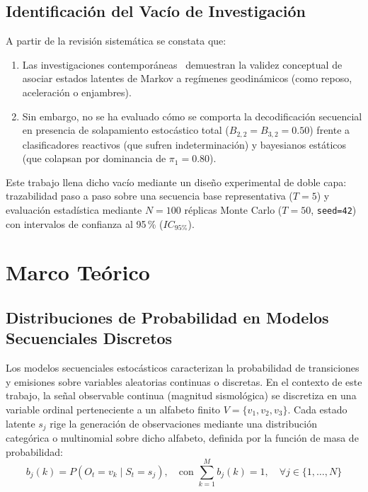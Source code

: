 \documentclass[11pt,a4paper]{article}
\begin{document}
\subsection{Identificación del Vacío de Investigación}

A partir de la revisión sistemática se constata que:
\begin{enumerate}
    \item Las investigaciones contemporáneas~\cite{georgakopoulou2024seismic, allen2023hidden, zhang2023statistical, danisman2021fitting} demuestran la validez conceptual de asociar estados latentes de Markov a regímenes geodinámicos (como reposo, aceleración o enjambres).
    \item Sin embargo, no se ha evaluado cómo se comporta la decodificación secuencial en presencia de solapamiento estocástico total ($B_{2,2} = B_{3,2} = 0.50$) frente a clasificadores reactivos (que sufren indeterminación) y bayesianos estáticos (que colapsan por dominancia de $\pi_1 = 0.80$).
\end{enumerate}

Este trabajo llena dicho vacío mediante un diseño experimental de doble capa: trazabilidad paso a paso sobre una secuencia base representativa ($T=5$) y evaluación estadística mediante $N=100$ réplicas Monte Carlo ($T=50$, \texttt{seed=42}) con intervalos de confianza al 95\,\% ($IC_{95\%}$).

\section{Marco Teórico}

\subsection{Distribuciones de Probabilidad en Modelos Secuenciales Discretos}

Los modelos secuenciales estocásticos caracterizan la probabilidad de transiciones y emisiones sobre variables aleatorias continuas o discretas. En el contexto de este trabajo, la señal observable continua (magnitud sismológica) se discretiza en una variable ordinal perteneciente a un alfabeto finito $V = \{v_1, v_2, v_3\}$. Cada estado latente $s_j$ rige la generación de observaciones mediante una distribución categórica o multinomial sobre dicho alfabeto, definida por la función de masa de probabilidad:
\begin{equation}
b_j(k) = P(O_t = v_k \mid S_t = s_j), \quad \text{con } \sum_{k=1}^M b_j(k) = 1, \quad \forall j \in \{1, \dots, N\}
\end{equation}
\end{document}
